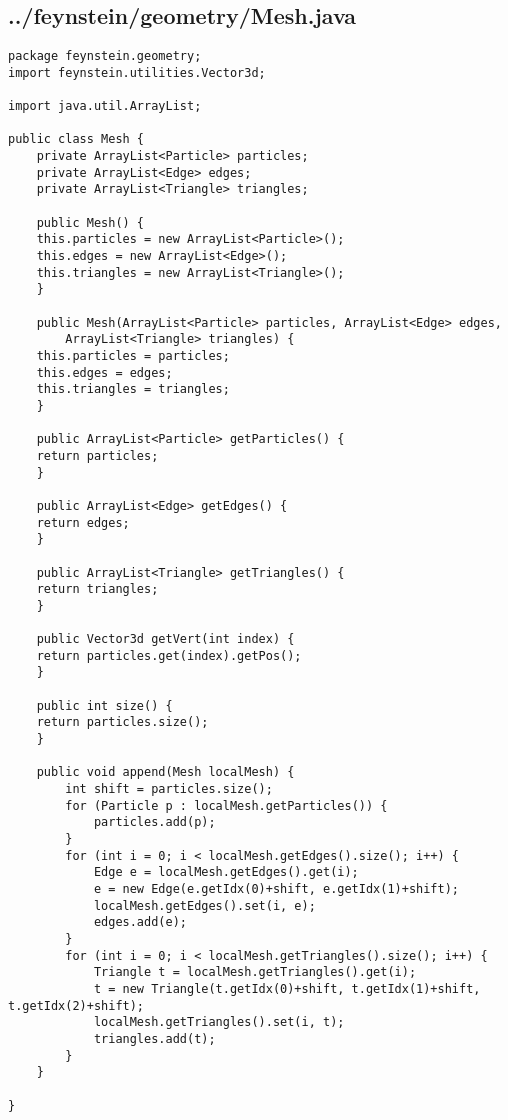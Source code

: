 \subsection*{../feynstein/geometry/Mesh.java}
\begin{lstlisting}
package feynstein.geometry;
import feynstein.utilities.Vector3d;

import java.util.ArrayList;

public class Mesh {
    private ArrayList<Particle> particles;
    private ArrayList<Edge> edges;
    private ArrayList<Triangle> triangles;
	
    public Mesh() {
	this.particles = new ArrayList<Particle>();
	this.edges = new ArrayList<Edge>();
	this.triangles = new ArrayList<Triangle>();
    }
	
    public Mesh(ArrayList<Particle> particles, ArrayList<Edge> edges, 
		ArrayList<Triangle> triangles) {
	this.particles = particles;
	this.edges = edges;
	this.triangles = triangles;
    }
	
    public ArrayList<Particle> getParticles() {
	return particles;
    }
	
    public ArrayList<Edge> getEdges() {
	return edges;
    }
	
    public ArrayList<Triangle> getTriangles() {
	return triangles;
    }
	
    public Vector3d getVert(int index) {
	return particles.get(index).getPos();
    }
    
    public int size() {
	return particles.size();
    }
	
    public void append(Mesh localMesh) {
		int shift = particles.size();
		for (Particle p : localMesh.getParticles()) {
			particles.add(p);
		}
		for (int i = 0; i < localMesh.getEdges().size(); i++) {
			Edge e = localMesh.getEdges().get(i);
			e = new Edge(e.getIdx(0)+shift, e.getIdx(1)+shift);
			localMesh.getEdges().set(i, e);
			edges.add(e);
		}
		for (int i = 0; i < localMesh.getTriangles().size(); i++) {
			Triangle t = localMesh.getTriangles().get(i);
			t = new Triangle(t.getIdx(0)+shift, t.getIdx(1)+shift, t.getIdx(2)+shift);
			localMesh.getTriangles().set(i, t);
			triangles.add(t);
		}
	}
	
}\end{lstlisting}

